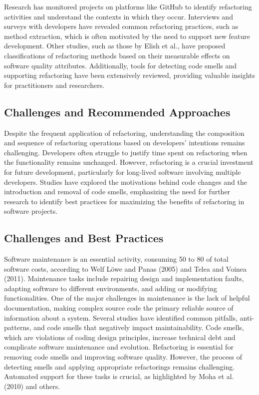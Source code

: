 Research has monitored projects on platforms like GitHub to identify refactoring activities and understand the contexts in which they occur. Interviews and surveys with developers have revealed common refactoring practices, such as method extraction, which is often motivated by the need to support new feature development. Other studies, such as those by Elish et al., have proposed classifications of refactoring methods based on their measurable effects on software quality attributes. Additionally, tools for detecting code smells and supporting refactoring have been extensively reviewed, providing valuable insights for practitioners and researchers.

\subsection{Challenges and Recommended Approaches}
Despite the frequent application of refactoring, understanding the composition and sequence of refactoring operations based on developers' intentions remains challenging. Developers often struggle to justify time spent on refactoring when the functionality remains unchanged. However, refactoring is a crucial investment for future development, particularly for long-lived software involving multiple developers. Studies have explored the motivations behind code changes and the introduction and removal of code smells, emphasizing the need for further research to identify best practices for maximizing the benefits of refactoring in software projects.

\subsection{Challenges and Best Practices}
Software maintenance is an essential activity, consuming 50 to 80 of total software costs, according to Welf Löwe and Panas (2005) and Telea and Voinea (2011). Maintenance tasks include repairing design and implementation faults, adapting software to different environments, and adding or modifying functionalities. One of the major challenges in maintenance is the lack of helpful documentation, making complex source code the primary reliable source of information about a system. Several studies have identified common pitfalls, anti-patterns, and code smells that negatively impact maintainability. Code smells, which are violations of coding design principles, increase technical debt and complicate software maintenance and evolution. Refactoring is essential for removing code smells and improving software quality. However, the process of detecting smells and applying appropriate refactorings remains challenging. Automated support for these tasks is crucial, as highlighted by Moha et al. (2010) and others.





